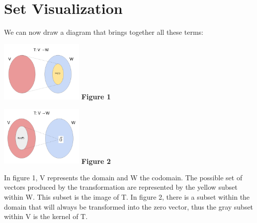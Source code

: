 \documentclass{article}
\begin{document}
\section{Set Visualization}
\par \noindent We can now draw a diagram that brings together all these terms:
\newline
\newline
\begin{minipage}[c]{.5\linewidth}
\includegraphics[width=4cm]{lt-image.png}
\newline
\textbf{Figure 1}
\end{minipage}
\begin{minipage}[c]{.5\linewidth}
\includegraphics[width=4cm]{lt-kernel.png}
\newline
\textbf{Figure 2}
\end{minipage}
\newline
\newline
\par \noindent In figure 1, V represents the domain and W the codomain. The possible set of vectors produced by the transformation are represented by the yellow subset within W. This subset is the image of T. In figure 2, there is a subset within the domain that will always be transformed into the zero vector, thus the gray subset within V is the kernel of T.
\end{document}
